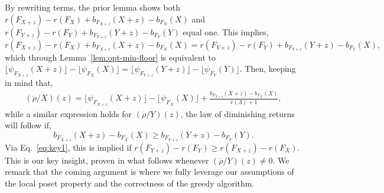 \documentclass[11pt]{article}
\newcommand{\glang}{\Lambda}
\newcommand{\greedyrep}{\ddot{\rho}}
\begin{document}
By rewriting terms, the prior lemma shows both $r(F_{X+z}) - r(F_X) + b_{F_{X+z}}(X+z) - b_{F_X}(X)$ and $r(F_{Y+z}) - r(F_Y) + b_{F_{Y+z}}(Y+z) - b_{F_Y}(Y)$ equal one.
This implies,
\begin{equation}\label{eq:key1}
    r(F_{X+z}) - r(F_X) + b_{F_{X+z}}(X+z) - b_{F_X}(X) = r(F_{Y+z}) - r(F_Y) + b_{F_{Y+z}}(Y+z) - b_{F_Y}(X),
\end{equation}
which through Lemma~\ref{lem:opt-min-floor} is equivalent to $\lfloor \psi_{F_{X+z}}(X+z)\rfloor - \lfloor \psi_{F_X}(X)\rfloor = \lfloor \psi_{F_{Y+z}}(Y+z)\rfloor - \lfloor \psi_{F_Y}(Y)\rfloor$.
Then, keeping in mind that,
\begin{align*}
    \left(\greedyrep/X\right)(z) = \lfloor \psi_{F_{X+z}}(X+z)\rfloor - \lfloor \psi_{F_X}(X)\rfloor + \frac{b_{F_{X+z}}(X+z) - b_{F_X}(X)}{r(\glang)+1},
\end{align*}
while a similar expression holds for $\left(\greedyrep/Y\right)(z)$,
the law of diminishing returns will follow if,
\begin{equation}\label{eq:key2}
    b_{F_{X+z}}(X+z) - b_{F_X}(X) \geq b_{F_{Y+z}}(Y+z) - b_{F_Y}(Y).
\end{equation}
Via Eq.~\ref{eq:key1}, this is implied if $r(F_{Y+z}) - r(F_Y) \geq r(F_{X+z}) - r(F_X)$.
This is our key insight, proven in what follows whenever $\left(\greedyrep/Y\right)(z)\neq 0$.
We remark that the coming argument is where we fully leverage our assumptions of the local poset property and the correctness of the greedy algorithm.
\end{document}
